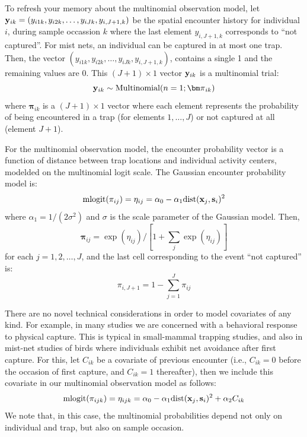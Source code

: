 To refresh your memory about the multinomial observation model, let ${\bf y}_{ik}
= (y_{i1k},y_{i2k},\ldots,y_{iJk},y_{i,J+1,k})$ be the spatial
encounter history for individual $i$, during sample occassion $k$
where the last element $y_{i,J+1,k}$ corresponds to ``not captured''.
For mist nets, an individual can be captured in at most one
trap. Then, the vector $(y_{i1k},y_{i2k},\ldots,y_{iJk},y_{i,J+1,k})$,
contains a single 1 and the remaining values are 0.  This $(J+1)\times
1$ vector ${\bf y}_{ik}$ is a multinomial trial:
\[
{\bf y}_{ik} \sim \mbox{Multinomial}(n=1; {\bm \pi}_{ik} )
\]
where ${\bm \pi}_{ik}$ is a $(J+1) \times 1$ vector where each element
represents the probability of being encountered in a trap (for
elements $1,\ldots,J$) or not captured at all (element $J+1$).

For the multinomial observation model, the encounter probability
vector is a function of distance between trap locations and individual
activity centers, modelded on the multinomial logit scale. The
Gaussian encounter probability model is:
\begin{equation}
\mbox{mlogit}(\pi_{ij}) = \eta_{ij}  =  \alpha_0 - \alpha_{1} \mbox{dist}({\bf x}_{j},{\bf s}_{i})^2
\label{hscr.eq.mlogit}
\end{equation}
where $\alpha_{1} = 1/(2\sigma^2)$ and $\sigma$ is the scale
parameter of the Gaussian model. Then,
\[
{\bm \pi}_{ij} = \exp(\eta_{ij})/[ 1 + \sum_{j} \exp(\eta_{ij}) ]
\]
for each $j=1,2,\ldots,J$, and the last cell corresponding to the
event ``not captured'' is:
\[
\pi_{i,J+1} = 1- \sum_{j=1}^{J} \pi_{ij}
\]

There are no novel technical considerations in order to model
covariates of any kind.  For example, in many studies we are concerned
with a behavioral response to physical capture. This is typical in
small-mammal trapping studies, and also in mist-net studies of birds
where individuals exhibit net avoidance after first capture. For this,
let $C_{ik}$ be a covariate of previous encounter (i.e., $C_{ik} = 0$
before the occasion of first capture, and $C_{ik} = 1$ thereafter),
then we include this covariate in our multinomial observation model as
follows:
\[
\mbox{mlogit}(\pi_{ijk}) = \eta_{ijk} = \alpha_{0}  - \alpha_{1}
\mbox{dist}({\bf  x}_{j},{\bf s}_{i})^2 +  \alpha_{2} C_{ik}
\]
We note that, in this case, the multinomial probabilities depend not only
on individual and trap, but also on sample occasion.





